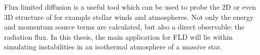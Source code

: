 Flux limited diffusion is a useful tool which can be used to probe the 2D or even 3D structure of for example stellar winds and atmospheres. Not only the energy and momentum source terms are calculated, but also a direct observable: the radiation flux. In this thesis, the main application for FLD will lie within simulating instabilities in an isothermal atmosphere of a massive star.